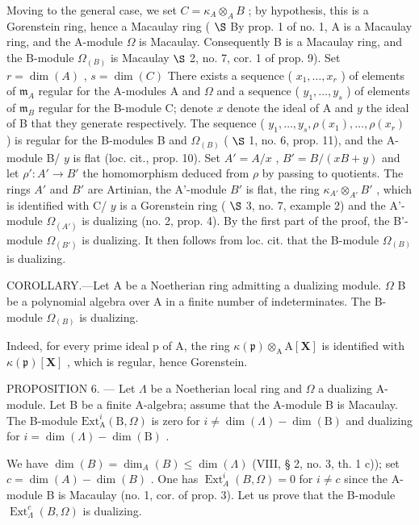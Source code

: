 Moving to the general case, we set \(C = \kappa_A \otimes_A B\) ; by hypothesis, this is a Gorenstein ring, hence a Macaulay ring ( \(\S\) By prop. 1 of no. 1, A is a Macaulay ring, and the A-module \(\Omega\) is Macaulay. Consequently B is a Macaulay ring, and the B-module \(\Omega_{(B)}\) is Macaulay \(\S\) 2, no. 7, cor. 1 of prop. 9). Set \(r = \dim(A)\) , \(s = \dim(C)\) There exists a sequence ( \(x_1, \ldots, x_r\) ) of elements of \(\mathfrak{m}_A\) regular for the A-modules A and \(\Omega\) and a sequence ( \(y_1, \ldots, y_s\) ) of elements of \(\mathfrak{m}_B\) regular for the B-module C; denote \(x\) denote the ideal of A and \(y\) the ideal of B that they generate respectively. The sequence ( \(y_1, \ldots, y_s, \rho(x_1), \ldots, \rho(x_r)\) ) is regular for the B-modules B and \(\Omega_{(B)}\) ( \(\S\) 1, no. 6, prop. 11), and the A-module B/ \(y\) is flat (loc. cit., prop. 10). Set \(A' = A/x\) , \(B' = B/(xB + y)\) and let \(\rho': A' \to B'\) the homomorphism deduced from \(\rho\) by passing to quotients. The rings \(A'\) and \(B'\) are Artinian, the A'-module \(B'\) is flat, the ring \(\kappa_{A'} \otimes_{A'} B'\) , which is identified with C/ \(y\) is a Gorenstein ring ( \(\S\) 3, no. 7, example 2) and the A'-module \(\Omega_{(A')}\) is dualizing (no. 2, prop. 4). By the first part of the proof, the B'-module \(\Omega_{(B')}\) is dualizing. It then follows from loc. cit. that the B-module \(\Omega_{(B)}\) is dualizing.

COROLLARY.---Let A be a Noetherian ring admitting a dualizing module. \(\Omega\) B be a polynomial algebra over A in a finite number of indeterminates. The B-module \(\Omega_{(B)}\) is dualizing.

Indeed, for every prime ideal p of A, the ring \(\kappa(\mathfrak{p})\otimes_{\mathrm{A}}\mathrm{A}[\mathbf{X}]\) is identified with \(\kappa(\mathfrak{p})[\mathbf{X}]\) , which is regular, hence Gorenstein.

PROPOSITION 6. — Let \(\Lambda\) be a Noetherian local ring and \(\Omega\) a dualizing A-module. Let B be a finite A-algebra; assume that the A-module B is Macaulay. The B-module \(\mathrm{Ext}_{\mathrm{A}}^{i}(\mathrm{B},\Omega)\) is zero for \(i\neq \dim (\Lambda) - \dim (\mathrm{B})\) and dualizing for \(i = \dim (\Lambda) - \dim (\mathrm{B})\) .

We have \(\dim(B) = \dim_{A}(B) \leqslant \dim(\Lambda)\) (VIII, § 2, no. 3, th. 1 c)); set \(c = \dim(A) - \dim(B)\) . One has \(\operatorname{Ext}_{A}^{i}(B, \Omega) = 0\) for \(i \neq c\) since the A-module B is Macaulay (no. 1, cor. of prop. 3). Let us prove that the B-module \(\operatorname{Ext}_{\Lambda}^{c}(B, \Omega)\) is dualizing.


